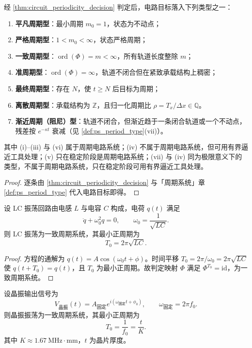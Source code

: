 \begin{corollary}[电路周期类型]\label{cor:circuit_period_type}
经 \cref{thm:circuit_periodicity_decision} 判定后，电路目标落入下列类型之一：
\begin{enumerate}[label=(\roman*)]
    \item \textbf{平凡周期型}：最小周期 $m_0=1$，状态为不动点；
    \item \textbf{严格周期型}：$1<m_0<\infty$，状态严格周期；
    \item \textbf{一致周期型}：$\operatorname{ord}(\Phi)=m<\infty$，所有轨道长度整除 $m$；
    \item \textbf{准周期型}：$\operatorname{ord}(\Phi)=\infty$，轨道不闭合但在紧致承载结构上稠密；
    \item \textbf{最终周期型}：存在 $N$，使 $t\ge N$ 后目标为周期；
    \item \textbf{离散周期型}：承载结构为 $\mathbb Z$，且归一化周期比 $\rho=T_x/\Delta x\in\mathbb Q$。
    \item \textbf{渐近周期（阻尼）型}：轨道不闭合，但渐近趋于一条闭合轨道或一个不动点，残差按 $e^{-\kappa t}$ 衰减（见 \cref{def:ps_period_type}(vii)）。
\end{enumerate}
其中 (i)--(iii) 与 (vi) 属于周期电路系统；(iv) 不属于周期电路系统，但可用有界逼近工具处理；(v) 只在稳定阶段是周期电路系统；(vii) 与 (iv) 同为极限意义下的类型，不属于周期电路系统，只在稳定阶段可用有界逼近工具处理。
\end{corollary}

\begin{proof}
逐条由 \cref{thm:circuit_periodicity_decision} 与「周期系统」章 \cref{def:ps_period_type} 代入电路目标即得。
\end{proof}

\begin{lemma}[LC 振荡的周期判定]\label{lem:lc_oscillator_periodic}
设 LC 振荡回路由电感 $L$ 与电容 $C$ 构成，电荷 $q(t)$ 满足
\[
\ddot q+\omega_0^2q=0,\qquad \omega_0=\frac{1}{\sqrt{LC}}.
\]
则 LC 振荡为一致周期系统，其最小正周期为
\[
T_0=2\pi\sqrt{LC}.
\]
\end{lemma}

\begin{proof}
方程的通解为 $q(t)=A\cos(\omega_0t+\phi)$。时间平移 $T_0=2\pi/\omega_0=2\pi\sqrt{LC}$ 使 $q(t+T_0)=q(t)$，且 $T_0$ 为最小正周期。故判定映射 $\Phi$ 满足 $\Phi^{T_0}=\mathrm{id}$，为一致周期系统。
\end{proof}

\begin{lemma}[晶振振荡的周期判定]\label{lem:quartz_periodic}
设晶振输出信号为
\[
V_{\text{晶振}}(t)=A_{\text{固定}}e^{i(\omega_{\text{固定}}t+\phi_0)},\qquad \omega_{\text{固定}}=2\pi f_0.
\]
则晶振振荡为一致周期系统，其最小正周期为
\[
T_0=\frac{1}{f_0}=\frac{t}{K}.
\]
其中 $K\approx 1.67\ \text{MHz}\cdot\text{mm}$，$t$ 为晶片厚度。
\end{lemma}

